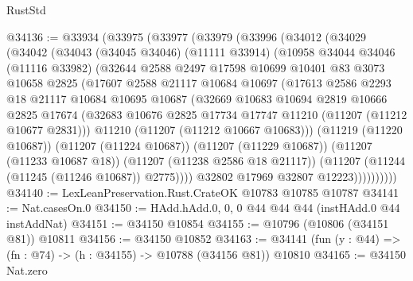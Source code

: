 \begin{lexlean}{RustStd}
\begin{coremodule}
@34136 := @33934
    (@33975
      (@33977
        (@33979
          (@33996
            (@34012
              (@34029
                (@34042
                  (@34043
                    (@34045 @34046)
                    (@11111 @33914)
                    (@10958
                      @34044
                      @34046
                      (@11116 @33982)
                      (@32644
                        @2588
                        @2497
                        @17598
                        @10699
                        @10401
                        @83
                        @3073
                        @10658
                        @2825
                        (@17607
                          @2588
                          @21117
                          @10684
                          @10697
                          (@17613
                            @2586
                            @2293
                            @18
                            @21117
                            @10684
                            @10695
                            @10687
                            (@32669
                              @10683
                              @10694
                              @2819
                              @10666
                              @2825
                              @17674
                              (@32683
                                @10676
                                @2825
                                @17734
                                @17747
                                @11210
                                (@11207 (@11212 @10677 @2831)))
                              @11210
                              (@11207 (@11212 @10667 @10683)))
                            (@11219 (@11220 @10687))
                            (@11207 (@11224 @10687))
                            (@11207 (@11229 @10687))
                            (@11207 (@11233 @10687 @18))
                            (@11207 (@11238 @2586 @18 @21117))
                            (@11207 (@11244 (@11245 (@11246 @10687)) @2775))))
                        @32802
                        @17969
                        @32807
                        @12223))))))))))
@34140 := LexLeanPreservation.Rust.CrateOK @10783 @10785 @10787
@34141 := Nat.casesOn.{0}
@34150 := HAdd.hAdd.{0, 0, 0} @44 @44 @44 (instHAdd.{0} @44 instAddNat)
@34151 := @34150 @10854
@34155 := @10796 (@10806 (@34151 @81)) @10811
@34156 := @34150 @10852
@34163 := @34141 (fun (y : @44) => (fn : @74) -> (h : @34155) -> @10788 (@34156 @81)) @10810
@34165 := @34150 Nat.zero

\end{coremodule}
\end{lexlean}
